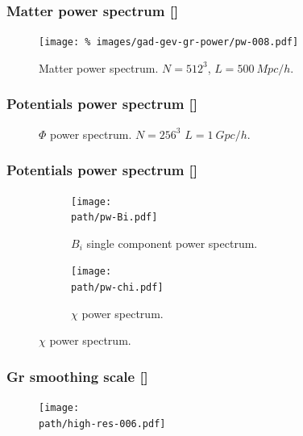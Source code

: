 \documentclass{beamer}
\makeatletter
\newcommand{\mylabel}{%
   [\beamer@againname]}
\makeatother
\begin{document}
\begin{frame}[label=matterpowerGR]
    \frametitle{Matter power spectrum\mylabel}
    \vspace*{-.5cm}
    \begin{figure}
    \centering\texttt{[image: \%
        images/gad-gev-gr-power/pw-008.pdf]}%
        \caption{Matter power spectrum. $N=512^3$, $L=\SI{500}{Mpc}/h$.}
    \end{figure}
\end{frame}


\begin{frame}[label=Phipower]
    \frametitle{Potentials power spectrum\mylabel}
    \vspace*{-.5cm}
    \begin{figure}
        \caption{$\Phi$ power spectrum. $N=256^3$ $L=\SI{1}{Gpc}/h$.}
    \end{figure}
\end{frame}

\begin{frame}[label=Bipower]
    \frametitle{Potentials power spectrum\mylabel}
  \def\path{images}%
  \begin{figure}
      \begin{subfigure}[t]{.49\textwidth}
      \texttt{[image: \\path/pw-Bi.pdf]}%
      \caption{$B_i$ single component power spectrum.}
      \end{subfigure}
      \begin{subfigure}[t]{.49\textwidth}
      \texttt{[image: \\path/pw-chi.pdf]}%
      \caption{$\chi$ power spectrum.}
      \end{subfigure}
  \end{figure}
\end{frame}

\begin{frame}[label=grcuttest]
    \frametitle{Gr smoothing scale\mylabel}
  \def\path{images/test-gr-cut}%
  \begin{figure}
      \texttt{[image: \\path/high-res-006.pdf]}%
  \end{figure}
\end{frame}
\end{document}

